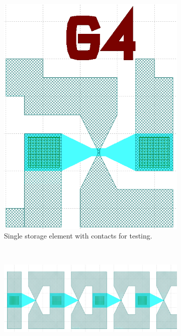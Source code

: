 \begin{figure}
    \centering
    \begin{subfigure}[b]{0.35\paperwidth}
    	\centering
        \includegraphics[width=0.15\paperwidth]{img/04/mask_single.png}
        \caption{Single storage element with contacts for testing.}
        \label{FabricationMaskDeta}
    \end{subfigure}
    ~ %
    \begin{subfigure}[b]{0.35\paperwidth}
    	\centering
        \includegraphics[width=0.3\paperwidth]{img/04/mask_series_big.png}

\end{subfigure}
\end{figure}
